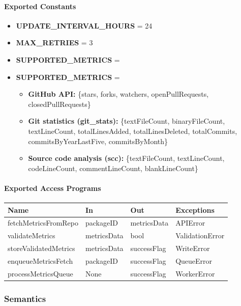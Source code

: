 \documentclass[12pt, titlepage]{article}
\begin{document}
\paragraph{Exported Constants}
\begin{itemize}
  \item \textbf{UPDATE\_INTERVAL\_HOURS} = 24
  \item \textbf{MAX\_RETRIES} = 3
  \item \textbf{SUPPORTED\_METRICS} =
 \item \textbf{SUPPORTED\_METRICS} =
\begin{itemize}
  \item \textbf{GitHub API:} \{stars, forks, watchers, openPullRequests, closedPullRequests\}
  \item \textbf{Git statistics (git\_stats):} \{textFileCount, binaryFileCount, textLineCount, totalLinesAdded, totalLinesDeleted, totalCommits, commitsByYearLastFive, commitsByMonth\}
  \item \textbf{Source code analysis (scc):} \{textFileCount, textLineCount, codeLineCount, commentLineCount, blankLineCount\}
\end{itemize}
\end{itemize}

\paragraph{Exported Access Programs}
\begin{center}
\renewcommand{\arraystretch}{1.2}
\begin{tabularx}{\textwidth}{l X X l}
\toprule
\textbf{Name} & \textbf{In} & \textbf{Out} & \textbf{Exceptions}\\
\midrule
fetchMetricsFromRepo & packageID & metricsData & APIError \\
validateMetrics & metricsData & bool & ValidationError \\
storeValidatedMetrics & metricsData & successFlag & WriteError \\
enqueueMetricsFetch & packageID & successFlag & QueueError \\
processMetricsQueue & None & successFlag & WorkerError \\
\bottomrule
\end{tabularx}
\end{center}

\subsubsection{Semantics}
\end{document}
